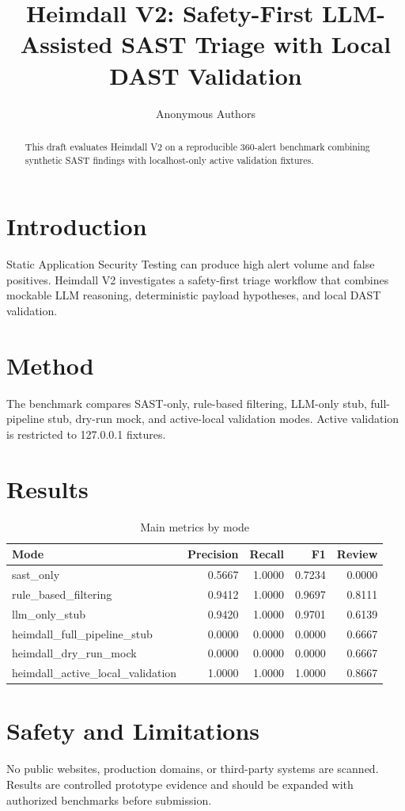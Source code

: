 \documentclass[conference]{IEEEtran}
\title{Heimdall V2: Safety-First LLM-Assisted SAST Triage with Local DAST Validation}
\author{Anonymous Authors}
\begin{document}
\maketitle
\begin{abstract}
This draft evaluates Heimdall V2 on a reproducible 360-alert benchmark combining synthetic SAST findings with localhost-only active validation fixtures.
\end{abstract}
\section{Introduction}
Static Application Security Testing can produce high alert volume and false positives. Heimdall V2 investigates a safety-first triage workflow that combines mockable LLM reasoning, deterministic payload hypotheses, and local DAST validation.
\section{Method}
The benchmark compares SAST-only, rule-based filtering, LLM-only stub, full-pipeline stub, dry-run mock, and active-local validation modes. Active validation is restricted to 127.0.0.1 fixtures.
\section{Results}
\begin{table}[h]
\centering
\caption{Main metrics by mode}
\begin{tabular}{lrrrr}
\toprule
Mode & Precision & Recall & F1 & Review \\
\midrule
sast_only & 0.5667 & 1.0000 & 0.7234 & 0.0000 \\
rule_based_filtering & 0.9412 & 1.0000 & 0.9697 & 0.8111 \\
llm_only_stub & 0.9420 & 1.0000 & 0.9701 & 0.6139 \\
heimdall_full_pipeline_stub & 0.0000 & 0.0000 & 0.0000 & 0.6667 \\
heimdall_dry_run_mock & 0.0000 & 0.0000 & 0.0000 & 0.6667 \\
heimdall_active_local_validation & 1.0000 & 1.0000 & 1.0000 & 0.8667 \\
\bottomrule
\end{tabular}
\end{table}
\section{Safety and Limitations}
No public websites, production domains, or third-party systems are scanned. Results are controlled prototype evidence and should be expanded with authorized benchmarks before submission.


\end{document}
